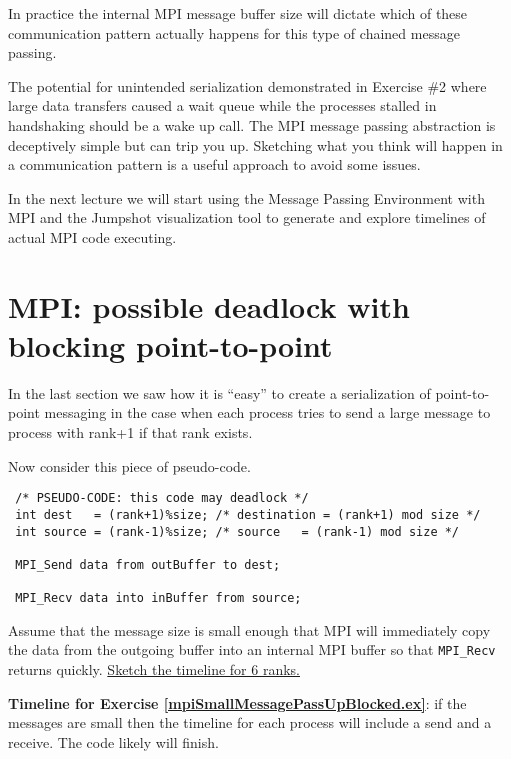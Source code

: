 In practice the internal MPI message buffer size will dictate which of these communication pattern actually happens for this type of chained message passing. 


The potential for unintended serialization demonstrated in Exercise \#2 where large data transfers caused a wait queue while the processes stalled in handshaking should be a wake up call. The MPI message passing abstraction is deceptively simple but can trip you up. Sketching what you think will happen in a communication pattern is a useful approach to avoid some issues.

In the next lecture we will start using the Message Passing Environment with MPI and the Jumpshot visualization tool to generate and explore timelines of actual MPI code executing. 

\section{MPI: possible deadlock with blocking point-to-point}

In the last section we saw how it is ``easy'' to create a serialization of point-to-point messaging in the case when each process tries to send a large message to process with rank+1 if that rank exists.

Now consider this piece of pseudo-code.

\begin{verbatim}
 /* PSEUDO-CODE: this code may deadlock */
 int dest   = (rank+1)%size; /* destination = (rank+1) mod size */
 int source = (rank-1)%size; /* source   = (rank-1) mod size */
 
 MPI_Send data from outBuffer to dest;

 MPI_Recv data into inBuffer from source;
\end{verbatim}

\begin{Exercise}
\label{mpiSmallMessagePassUpBlocked.ex}
Assume that the message size is small enough that MPI will immediately copy the data from the outgoing buffer into an internal MPI buffer so that  \texttt{MPI\_Recv} returns quickly.
\underline{Sketch the timeline for 6 ranks.}
\end{Exercise}

\begin{Answer}
{\bf Timeline for Exercise \ref{mpiSmallMessagePassUpBlocked.ex}}: if the messages are small then the timeline for each process will include a send and a receive. The code likely will finish.
\end{Answer}

